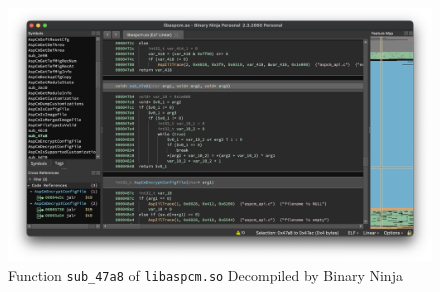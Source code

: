 \begin{figure}[h]
    \centering
    \includegraphics[width=\linewidth]{contents/configuration-analysis/configuration-file/libaspcm-so.png}
    \caption{Function \texttt{sub\_47a8} of \texttt{libaspcm.so} Decompiled by Binary Ninja}
    \label{figure:libaspcm_so}
\end{figure}

\FloatBarrier
